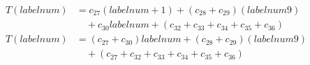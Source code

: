 \begin{subequations}
\label{eq:analyse-arlabeling-calcregiondata-3}
\begin{align}
\label{eq:analyse-arlabeling-calcregiondata-3-1}
T(\mathit{labelnum})& = c_{27}(\mathit{labelnum} + 1) + (c_{28} + c_{29})(\mathit{labelnum} 9) \\
& \quad + c_{30}\mathit{labelnum} + (c_{32} + c_{33} + c_{34} + c_{35} + c_{36}) \nonumber \\
\label{eq:analyse-arlabeling-calcregiondata-3-2}
T(\mathit{labelnum})& = (c_{27} + c_{30})\mathit{labelnum} + (c_{28} + c_{29})(\mathit{labelnum} 9) \\
& \quad + (c_{27} + c_{32} + c_{33} + c_{34} + c_{35} + c_{36}) \nonumber
\end{align}	
\end{subequations}
